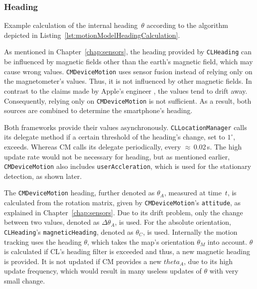 \subsubsection*{Heading}


\begin{table}
	
	\caption{Example calculation of the internal heading~$\theta$ according to the algorithm depicted in Listing~\ref{lst:motionModelHeadingCalculation}.}
	\label{tab:motionModelHeadingCalculationExample}
\end{table}

As mentioned in Chapter~\ref{chap:sensors}, the heading provided by \texttt{CLHeading} can be influenced by magnetic fields other than the earth's magnetic field, which may cause wrong values. \texttt{CMDeviceMotion} uses sensor fusion instead of relying only on the magnetometer's values. Thus, it is not influenced by other magnetic fields. In contrast to the claims made by Apple's engineer \citet{apple:wwdc_2012_pham}, the values tend to drift away. Consequently, relying only on \texttt{CMDeviceMotion} is not sufficient. As a result, both sources are combined to determine the smartphone's heading.

Both frameworks provide their values asynchronously. \texttt{CLLocationManager} calls its delegate method if a certain threshold of the heading's change, set to $1^\circ$, exceeds. Whereas \acs{CM} calls its delegate periodically, every $\approx$\,0.02\,s. The high update rate would not be necessary for heading, but as mentioned earlier, \texttt{CMDeviceMotion} also includes \texttt{userAccleration}, which is used for the stationary detection, as shown later.

The \texttt{CMDeviceMotion} heading, further denoted as $\theta_A$, measured at time~$t$, is calculated from the rotation matrix, given by \texttt{CMDeviceMotion}'s \texttt{attitude}, as explained in Chapter~\ref{chap:sensors}. Due to its drift problem, only the change between two values, denoted as $\Delta\theta_A$, is used. For the absolute orientation, \texttt{CLHeading}'s \texttt{magneticHeading}, denoted as $\theta_C$, is used. Internally the motion tracking uses the heading $\theta$, which takes the map's orientation $\theta_M$ into account. $\theta$ is calculated if \acs{CL}'s heading filter is exceeded and thus, a new magnetic heading is provided. It is not updated if \acs{CM} provides a new $theta_A$, due to its high update frequency, which would result in many useless updates of $\theta$ with very small change.

